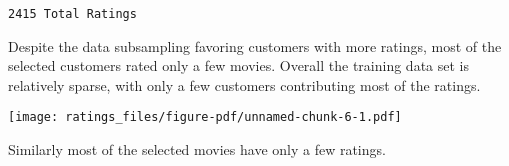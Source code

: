 \documentclass[
  letterpaper,
  DIV=11,
  numbers=noendperiod]{scrartcl}
\newenvironment{Shaded}{\begin{snugshade}}{\end{snugshade}}
\newcommand{\AttributeTok}[1]{\textcolor[rgb]{0.40,0.45,0.13}{#1}}
\newcommand{\DecValTok}[1]{\textcolor[rgb]{0.68,0.00,0.00}{#1}}
\newcommand{\FloatTok}[1]{\textcolor[rgb]{0.68,0.00,0.00}{#1}}
\newcommand{\FunctionTok}[1]{\textcolor[rgb]{0.28,0.35,0.67}{#1}}
\newcommand{\NormalTok}[1]{\textcolor[rgb]{0.00,0.23,0.31}{#1}}
\newcommand{\SpecialCharTok}[1]{\textcolor[rgb]{0.37,0.37,0.37}{#1}}
\newcommand{\StringTok}[1]{\textcolor[rgb]{0.13,0.47,0.30}{#1}}
\begin{document}
\begin{verbatim}
2415 Total Ratings
\end{verbatim}

Despite the data subsampling favoring customers with more ratings, most
of the selected customers rated only a few movies. Overall the training
data set is relatively sparse, with only a few customers contributing
most of the ratings.

\begin{Shaded}
\end{Shaded}

\texttt{[image: ratings\_files/figure-pdf/unnamed-chunk-6-1.pdf]}

Similarly most of the selected movies have only a few ratings.

\begin{Shaded}
\end{Shaded}
\end{document}
